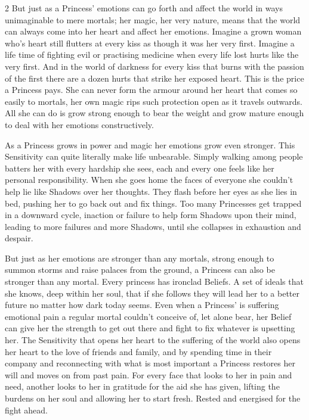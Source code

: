 \begin{multicols}{2}
But just as a Princess' emotions can go forth and affect the world in ways unimaginable to mere mortals; her magic, her very nature, means that the world can always come into her heart and affect her emotions. Imagine a grown woman who's heart still flutters at every kiss as though it was her very first. Imagine a life time of fighting evil or practising medicine when every life lost hurts like the very first. And in the world of darkness for every kiss that burns with the passion of the first there are a dozen hurts that strike her exposed heart. This is the price a Princess pays. She can never form the armour around her heart that comes so easily to mortals, her own magic rips such protection open as it travels outwards. All she can do is grow strong enough to bear the weight and grow mature enough to deal with her emotions constructively. 

As a Princess grows in power and magic her emotions grow even stronger. This Sensitivity can quite literally make life unbearable. Simply walking among people batters her with every hardship she sees, each and every one feels like her personal responsibility. When she goes home the faces of everyone she couldn't help lie like Shadows over her thoughts. They flash before her eyes as she lies in bed, pushing her to go back out and fix things. Too many Princesses get trapped in a downward cycle, inaction or failure to help form Shadows upon their mind, leading to more failures and more Shadows, until she collapses in exhaustion and despair. 

But just as her emotions are stronger than any mortals, strong enough to summon storms and raise palaces from the ground, a Princess can also be stronger than any mortal. Every princess has ironclad Beliefs. A set of ideals that she knows, deep within her soul, that if she follows they will lead her to a better future no matter how dark today seems. Even when a Princess' is suffering emotional pain a regular mortal couldn't conceive of, let alone bear, her Belief can give her the strength to get out there and fight to fix whatever is upsetting her. The Sensitivity that opens her heart to the suffering of the world also opens her heart to the love of friends and family, and by spending time in their company and reconnecting with what is most important a Princess restores her will and moves on from past pain. For every face that looks to her in pain and need, another looks to her in gratitude for the aid she has given, lifting the burdens on her soul and allowing her to start fresh. Rested and energised for the fight ahead. 


\end{multicols}
